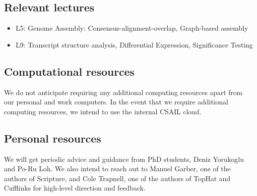 \documentclass[12pt]{article}
\begin{document}
\subsection*{Relevant lectures}
\begin{itemize}
\item L5: Genome Assembly: Consensus-alignment-overlap, Graph-based assembly
\item L9: Transcript structure analysis, Differential Expression, Significance Testing
\end{itemize}
\subsection*{Computational resources}
We do not anticipate requiring any additional computing resources apart from our personal and work computers. In the event that we require additional computing resources, we intend to use the internal CSAIL cloud.
\subsection*{Personal resources}
We will get periodic advice and guidance from PhD students, Deniz Yorukoglu and Po-Ru Loh. We also intend to reach out to Manuel Garber, one of the authors of Scripture, and Cole Trapnell, one of the authors of TopHat and Cufflinks for high-level direction and feedback.
\newpage


\end{document}
